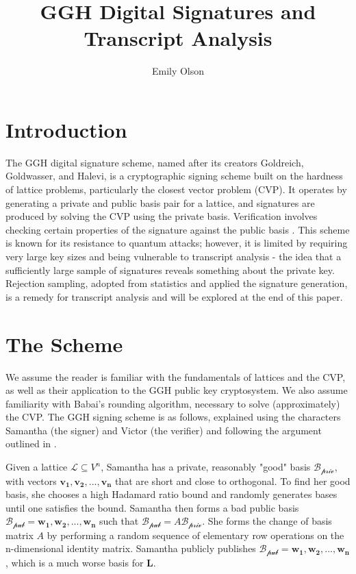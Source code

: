 \documentclass[11pt,reqno]{amsart}
\title{GGH Digital Signatures and Transcript Analysis}
\author[]{Emily Olson}
\theoremstyle{definition}
\begin{document}
\maketitle

\setcounter{tocdepth}{1}



\section{Introduction}


The GGH digital signature scheme, named after its creators Goldreich, Goldwasser, and Halevi, is a cryptographic signing scheme built on the hardness of lattice problems, particularly the closest vector problem (CVP). It operates by generating a private and public basis pair for a lattice, and signatures are produced by solving the CVP using the private basis. Verification involves checking certain properties of the signature against the public basis \cite{textbook}. This scheme is known for its resistance to quantum attacks; however, it is limited by requiring very large key sizes and being vulnerable to transcript analysis - the idea that a sufficiently large sample of signatures reveals something about the private key. Rejection sampling, adopted from statistics and applied the signature generation, is a remedy for transcript analysis and will be explored at the end of this paper. 


\section{The Scheme}
\label{sec1}

We assume the reader is familiar with the fundamentals of lattices and the CVP, as well as their application to the GGH public key cryptosystem. We also assume familiarity with Babai's rounding algorithm, necessary to solve (approximately) the CVP. The GGH signing scheme is as follows, explained using the characters Samantha (the signer) and Victor (the verifier) and following the argument outlined in \cite[Chapter 7.12]{textbook}.

Given a lattice $\mathcal{L}\subseteq V^n$, Samantha has a private, reasonably "good" basis $\mathcal{B_{\text{priv}}}$, with vectors $\mathbf{v_1, v_2, ... , v_n}$ that are short and close to orthogonal. To find her good basis, she chooses a high Hadamard ratio \cite[Remark 7.27]{textbook} bound and randomly generates bases until one satisfies the bound. Samantha then forms a bad public basis $\mathcal{B_{\text{pub}}} = \mathbf{w_1, w_2, ... , w_n}$ such that $\mathcal{B_{\text{pub}}} = A\mathcal{B_{\text{priv}}}$. She forms the change of basis matrix $A$ by performing a random sequence of elementary row operations on the n-dimensional identity matrix. Samantha publicly publishes $\mathcal{B_{\text{pub}}} = \mathbf{w_1, w_2, ... , w_n}$, which is a much worse basis for $\mathbf{L}$.
\end{document}
